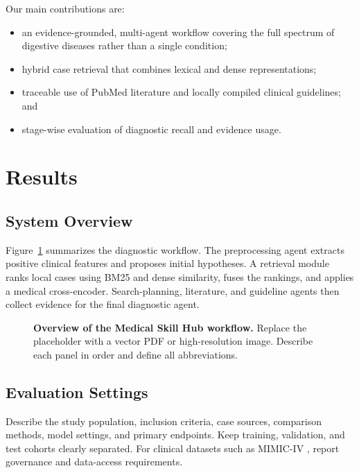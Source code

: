 \documentclass[10pt,letterpaper]{article}
\begin{document}
Our main contributions are:

\begin{itemize}
  \item an evidence-grounded, multi-agent workflow covering the full spectrum of
        digestive diseases rather than a single condition;
  \item hybrid case retrieval that combines lexical and dense representations;
  \item traceable use of PubMed literature and locally compiled clinical
        guidelines; and
  \item stage-wise evaluation of diagnostic recall and evidence usage.
\end{itemize}

\section{Results}

\subsection{System Overview}

Figure~\ref{fig:overview} summarizes the diagnostic workflow. The preprocessing
agent extracts positive clinical features and proposes initial hypotheses. A
retrieval module ranks local cases using BM25 and dense similarity, fuses the
rankings, and applies a medical cross-encoder. Search-planning, literature, and
guideline agents then collect evidence for the final diagnostic agent.

\begin{figure}[htbp]
  \centering
  \fbox{\rule{0pt}{2.15in}\rule{0.94\textwidth}{0pt}}
  \caption{\textbf{Overview of the Medical Skill Hub workflow.}
  Replace the placeholder with a vector PDF or high-resolution image. Describe
  each panel in order and define all abbreviations.}
  \label{fig:overview}
\end{figure}

\subsection{Evaluation Settings}

Describe the study population, inclusion criteria, case sources, comparison
methods, model settings, and primary endpoints. Keep training, validation, and
test cohorts clearly separated. For clinical datasets such as MIMIC-IV
\cite{johnson2023mimic}, report governance and data-access requirements.
\end{document}
